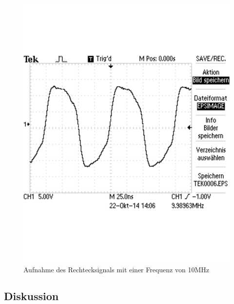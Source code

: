 \documentclass[12pt,a4paper]{article}
\begin{document}
\begin{figure}[H] 
  \centering
    \includegraphics[scale = 0.4]{2_2_rech_10mhz.pdf}
  	\caption[Aufnahme des Rechtecksignals mit einer Frequenz von 10MHz]{Aufnahme des Rechtecksignals mit einer Frequenz von 10MHz}
  \label{fig:2_2_rech_10mhz}
\end{figure}



\subsection{Diskussion}
\end{document}
